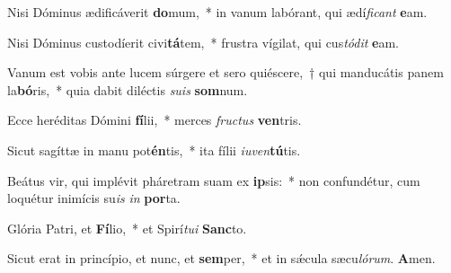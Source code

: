 \item Nisi Dóminus ædificáverit \textbf{do}mum,~* in vanum labórant, qui ædí\textit{ficant} \textbf{e}am.

\item Nisi Dóminus custodíerit civi\textbf{tá}tem,~* frustra vígilat, qui cus\textit{tódit} \textbf{e}am.

\item Vanum est vobis ante lucem súrgere et sero quiéscere,~† qui manducátis panem la\textbf{bó}ris,~* quia dabit diléctis \textit{suis} \textbf{som}num.

\item Ecce heréditas Dómini \textbf{fí}lii,~* merces \textit{fructus} \textbf{ven}tris.

\item Sicut sagíttæ in manu pot\textbf{én}tis,~* ita fílii \textit{iuven}\textbf{tú}tis.

\item Beátus vir, qui implévit pháretram suam ex \textbf{ip}sis:~* non confundétur, cum loquétur inimícis su\textit{is} \textit{in} \textbf{por}ta.

\item Glória Patri, et \textbf{Fí}lio,~* et Spirí\textit{tui} \textbf{Sanc}to.

\item Sicut erat in princípio, et nunc, et \textbf{sem}per,~* et in sǽcula sæcu\textit{lórum}. \textbf{A}men.
